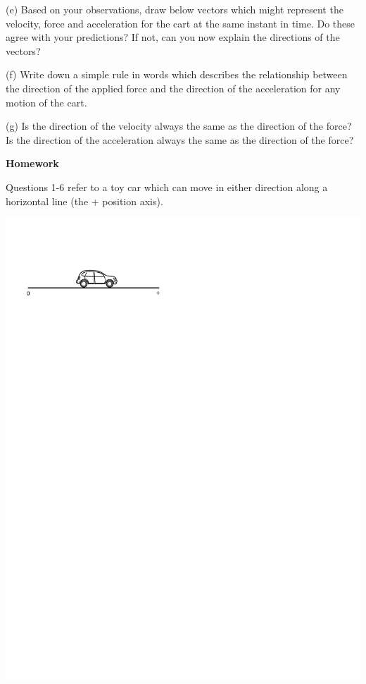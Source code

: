 (e) Based on your observations, draw below vectors which might represent the
velocity, force and acceleration for the cart at the same instant in time. Do
these agree with your predictions? If not, can you now explain the directions
of the vectors?
\answerspace{30mm}

(f) Write down a simple rule in words which describes the relationship between
the direction of the applied force and the direction of the acceleration for
any motion of the cart.
\answerspace{25mm}

(g) Is the direction of the velocity always the same as the direction of the
force? Is the direction of the acceleration always the same as the direction
of the force?
\answerspace{25mm}

\pagebreak[4]

\textbf{Homework}

Questions 1-6 refer to a toy car which can move in either direction along a
horizontal line (the + position axis).

\vspace{0.3cm}
{\par\centering \includegraphics{force2/car_on_ground_pm.pdf} \par}
\vspace{0.3cm}

